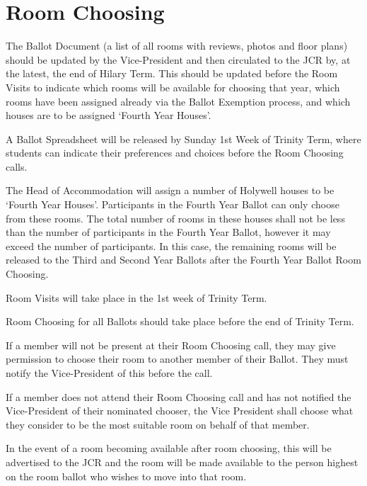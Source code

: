 \section{Room Choosing}

\npara The Ballot Document (a list of all rooms with reviews, photos and floor plans) should be updated by the Vice-President and then circulated to the JCR by, at the latest, the end of Hilary Term. This should be updated before the Room Visits to indicate which rooms will be available for choosing that year, which rooms have been assigned already via the Ballot Exemption process, and which houses are to be assigned ‘Fourth Year Houses’.

\npara A Ballot Spreadsheet will be released by Sunday 1st Week of Trinity Term, where students can indicate their preferences and choices before the Room Choosing calls.

\npara The Head of Accommodation will assign a number of Holywell houses to be ‘Fourth Year Houses’. Participants in the Fourth Year Ballot can only choose from these rooms. The total number of rooms in these houses shall not be less than the number of participants in the Fourth Year Ballot, however it may exceed the number of participants. In this case, the remaining rooms will be released to the Third and Second Year Ballots after the Fourth Year Ballot Room Choosing.

\npara Room Visits will take place in the 1st week of Trinity Term.

\npara Room Choosing for all Ballots should take place before the end of Trinity Term. 

\npara If a member will not be present at their Room Choosing call, they may give permission to choose their room to another member of their Ballot. They must notify the Vice-President of this before the call.

\npara If a member does not attend their Room Choosing call and has not notified the Vice-President of their nominated chooser, the Vice President shall choose what they consider to be the most suitable room on behalf of that member. 

\npara In the event of a room becoming available after room choosing, this will be advertised to the JCR and the room will be made available to the person highest on the room ballot who wishes to move into that room.

